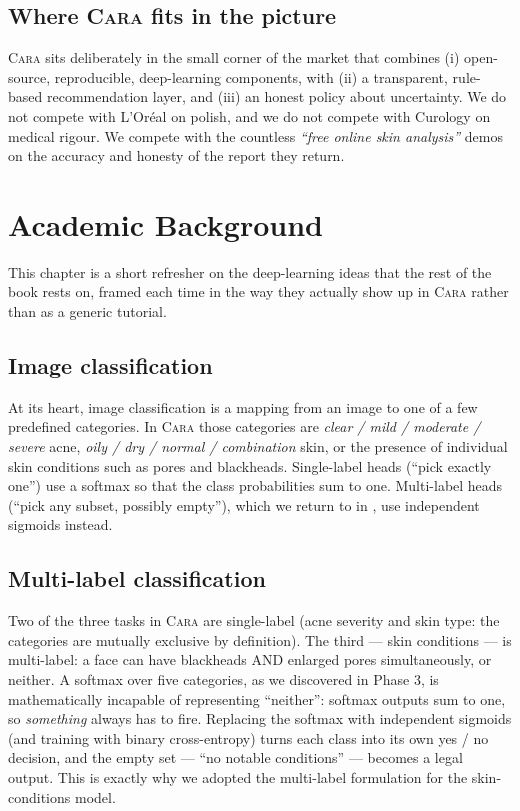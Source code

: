 \documentclass[11pt,a4paper,oneside]{report}
\newcommand{\cara}{\textsc{Cara}\xspace}
\begin{document}
\section{Where \cara fits in the picture}

\cara sits deliberately in the small corner of the market that
combines (i) open-source, reproducible, deep-learning components,
with (ii) a transparent, rule-based recommendation layer, and (iii)
an honest policy about uncertainty. We do not compete with L'Or\'eal
on polish, and we do not compete with Curology on medical rigour. We
compete with the countless \emph{``free online skin analysis''} demos
on the accuracy and honesty of the report they return.

\chapter{Academic Background}\label{ch:academic}

This chapter is a short refresher on the deep-learning ideas that
the rest of the book rests on, framed each time in the way they
actually show up in \cara rather than as a generic tutorial.

\section{Image classification}

At its heart, image classification is a mapping from an image to
one of a few predefined categories. In \cara those categories are
\emph{clear / mild / moderate / severe} acne, \emph{oily / dry /
normal / combination} skin, or the presence of individual skin
conditions such as pores and blackheads. Single-label heads
(``pick exactly one'') use a softmax so that the class
probabilities sum to one. Multi-label heads (``pick any subset,
possibly empty''), which we return to in
, use independent sigmoids instead.

\section{Multi-label classification}\label{sec:multilabel-formal}

Two of the three tasks in \cara are single-label (acne severity and
skin type: the categories are mutually exclusive by definition). The
third --- skin conditions --- is multi-label: a face can have
blackheads AND enlarged pores simultaneously, or neither. A softmax
over five categories, as we discovered in Phase 3, is mathematically
incapable of representing ``neither'': softmax outputs sum to one,
so \emph{something} always has to fire. Replacing the softmax with
independent sigmoids (and training with binary cross-entropy) turns
each class into its own yes / no decision, and the empty set ---
``no notable conditions'' --- becomes a legal output. This is
exactly why we adopted the multi-label formulation for the
skin-conditions model.
\end{document}
